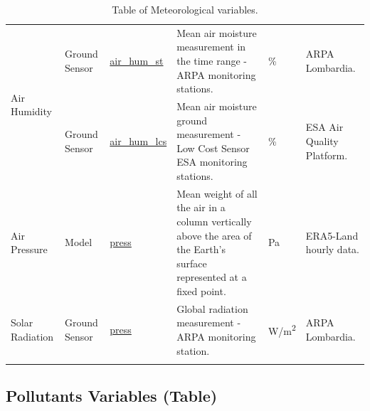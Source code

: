 \begin{center}
\begin{longtable}{ |p{2cm}|p{1.5cm}|p{2.3cm}|p{4cm}|p{1cm}|p{2cm}| }
\multirow{2}{4em}{Air Humidity} & Ground \newline Sensor  & \underline{air\_hum\_st} & Mean air moisture measurement in the time range - ARPA monitoring stations.\par & \% & ARPA \newline Lombardia.\\ 
& Ground \newline Sensor  & \underline{air\_hum\_lcs} &  Mean air moisture ground measurement - Low Cost Sensor ESA monitoring stations.\par & \% & ESA Air Quality Platform.\\ \hline

\multirow{1}{4em}{Air Pressure} & Model   & \underline{press} & Mean weight of all the air in a column vertically above the area of the Earth's surface represented at a fixed point.\par & Pa & ERA5-Land hourly data.\\ \hline

\multirow{1}{4em}{Solar Radiation} & Ground \newline Sensor  & \underline{press} & Global radiation measurement - ARPA monitoring station.\par & W/m\textsuperscript{2} & ARPA \newline Lombardia.\\ \hline

\hline
\caption{Table of Meteorological variables.}

\end{longtable}
\end{center}

\subsection{Pollutants Variables (Table)}



